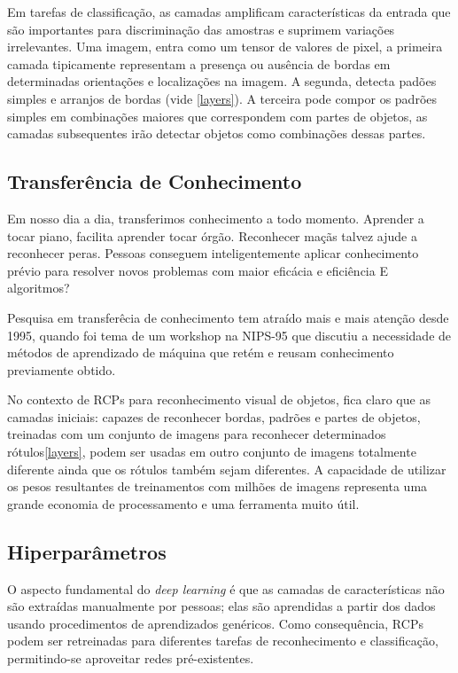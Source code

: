 \documentclass[conference]{IEEEtran}
\begin{document}
Em tarefas de classificação, as camadas amplificam características da entrada que são importantes para discriminação das amostras e suprimem variações irrelevantes. Uma imagem, entra como um tensor de valores de pixel,  a primeira camada tipicamente representam a presença ou ausência de bordas em determinadas orientações e localizações na imagem. A segunda, detecta padões simples e arranjos de bordas (vide \ref{layers}). A terceira pode compor os padrões simples em combinações maiores que correspondem com partes de objetos, as camadas subsequentes irão detectar objetos como combinações dessas partes\cite{hinton}.


\subsection{Transferência de Conhecimento}
Em nosso dia a dia, transferimos conhecimento a todo momento. Aprender a tocar piano, facilita aprender tocar órgão. Reconhecer maçãs talvez ajude a reconhecer peras. Pessoas conseguem inteligentemente aplicar conhecimento prévio para resolver novos problemas com maior eficácia e eficiência\cite{sinno} E algoritmos?

Pesquisa em transferêcia de conhecimento tem atraído mais e mais atenção desde 1995, quando foi tema de  um workshop na NIPS-95 que discutiu a necessidade de métodos de aprendizado de máquina que retém e reusam conhecimento previamente obtido\cite{sinno}. 

No contexto de RCPs para reconhecimento visual de objetos, fica claro que as camadas iniciais: capazes de reconhecer bordas, padrões e partes de objetos, treinadas com um conjunto de imagens para reconhecer determinados rótulos\ref{layers}, podem ser usadas em outro conjunto de imagens totalmente diferente ainda que os rótulos também sejam diferentes. A capacidade de utilizar os pesos resultantes de treinamentos com milhões de imagens representa uma grande economia de processamento e uma ferramenta muito útil. 


\subsection{Hiperparâmetros}
O aspecto fundamental do \textit{deep learning} é que as camadas de características não são extraídas manualmente por pessoas; elas são aprendidas a partir dos dados usando procedimentos de aprendizados genéricos. Como consequência, RCPs podem ser retreinadas para diferentes tarefas de reconhecimento e classificação, permitindo-se aproveitar redes pré-existentes. 
\end{document}
